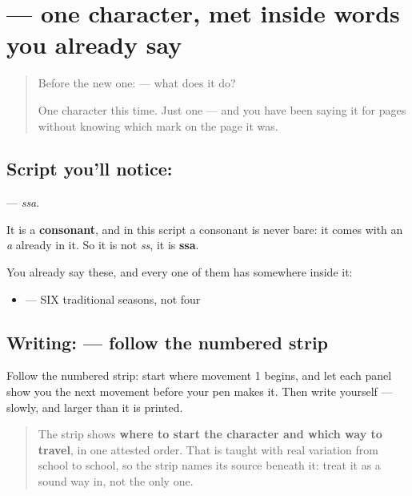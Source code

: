 \section[\texorpdfstring{\hi{ष} (ssa)}{ष (ssa)}]{ — one character, met inside words you already say}

\label{lesson:HI-S119-letter-ssa}



\begin{quote}
Before the new one:  — what does it do?

One character this time. Just one — and you have been saying it for pages without knowing which mark on the page it was.
\end{quote}

\subsection*{Script you'll notice: }
\textbf{} — \emph{ssa}.

It is a \textbf{consonant}, and in this script a consonant is never bare: it comes with an \emph{a} already in it. So it is not \emph{ss}, it is \textbf{ssa}.

You already say these, and every one of them has  somewhere inside it:

\begin{itemize}
\raggedright
  \item \textbf{     } — SIX traditional seasons, not four
\end{itemize}

\subsection*{Writing:  — follow the numbered strip}

Follow the numbered strip: start where movement 1 begins, and let each panel show you the next movement before your pen makes it. Then write  yourself — slowly, and larger than it is printed.

\begin{quote}
The strip shows \textbf{where to start the character and which way to travel}, in one attested order. That is taught with real variation from school to school, so the strip names its source beneath it: treat it as a sound way in, not the only one.
\end{quote}

